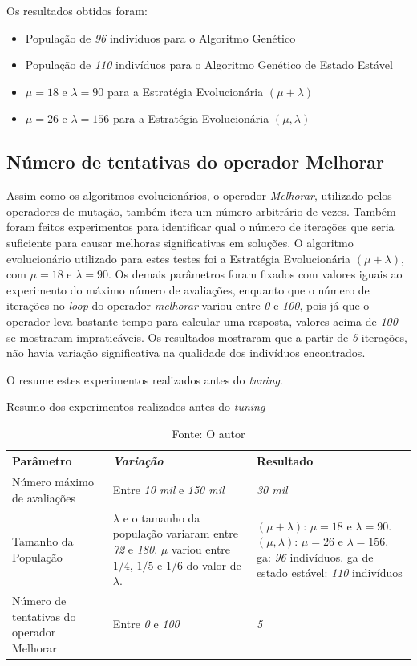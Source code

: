 Os resultados obtidos foram:
\begin{itemize}
	\item População de \textit{96} indivíduos para o Algoritmo Genético
	\item População de \textit{110} indivíduos para o Algoritmo Genético de 
	Estado Estável
	\item $\mu = 18$ e $\lambda = 90$ para a Estratégia Evolucionária 
	$(\mu + \lambda)$
	\item $\mu = 26$ e $\lambda = 156$ para a Estratégia Evolucionária 
	$(\mu, \lambda)$
\end{itemize}

\subsection{Número de tentativas do operador Melhorar}

Assim como os algoritmos evolucionários, o operador \textit{Melhorar}, utilizado 
pelos operadores de mutação, também itera um número arbitrário de vezes. Também 
foram feitos experimentos para identificar qual o número de iterações que seria 
suficiente para causar melhoras significativas em soluções. O algoritmo 
evolucionário utilizado para estes testes foi a Estratégia Evolucionária 
$(\mu + \lambda)$, com $\mu = 18$ e $\lambda = 90$. Os demais parâmetros foram 
fixados com valores iguais ao experimento do máximo número de avaliações, 
enquanto que o número de iterações no \textit{loop} do operador 
\textit{melhorar} variou entre \textit{0} e \textit{100}, pois já que o operador 
leva bastante tempo para calcular uma resposta, valores acima de \textit{100} se 
mostraram impraticáveis. Os resultados mostraram que a partir de \textit{5} 
iterações, não havia variação significativa na qualidade dos indivíduos 
encontrados.

O  resume estes experimentos realizados antes do 
\textit{tuning}.

\begin{table}
	\centering
	\caption{Resumo dos experimentos realizados antes do \textit{tuning}}
	\label{resume_pre_tuning}
	\begin{tabularx}{\linewidth}{|X|X|X|}
		\hline
		\textbf{Parâmetro} & \textbf{\textit{Variação}} & \textbf{Resultado} \\
		\hline
		Número máximo de avaliações & Entre \textit{10 mil} e \textit{150 mil} & \textit{30 mil} \\
		\hline
		Tamanho da População & $\lambda$ e o tamanho da população variaram entre 
		\textit{72} e \textit{180}. $\mu$ variou entre $1/4$, $1/5$ e $1/6$ do valor de $\lambda$. & $(\mu + \lambda)$: $\mu = 18$ e $\lambda = 90$. $(\mu, \lambda)$: $\mu = 26$ e $\lambda = 156$. \ac{ga}: \textit{96} indivíduos. \ac{ga} de estado estável: \textit{110} indivíduos \\
		\hline
		Número de tentativas do operador Melhorar & Entre \textit{0} e \textit{100} & \textit{5} \\
		\hline
	\end{tabularx}
	\caption*{Fonte: O autor}
\end{table}


